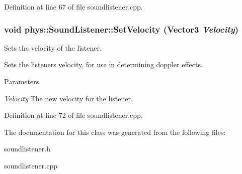 Definition at line 67 of file soundlistener.cpp.

\hypertarget{classphys_1_1SoundListener_a22e63d58ca9710f9a54fb08dbd9be4d9}{
\subsubsection[{SetVelocity}]{\setlength{\rightskip}{0pt plus 5cm}void phys::SoundListener::SetVelocity ({\bf Vector3} {\em Velocity})}}
\label{d1/d5a/classphys_1_1SoundListener_a22e63d58ca9710f9a54fb08dbd9be4d9}


Sets the velocity of the listener. 

Sets the listeners velocity, for use in determining doppler effects. 
\begin{DoxyParams}{Parameters}
\item[{\em Velocity}]The new velocity for the listener. \end{DoxyParams}


Definition at line 72 of file soundlistener.cpp.



The documentation for this class was generated from the following files:\begin{DoxyCompactItemize}
\item 
soundlistener.h\item 
soundlistener.cpp\end{DoxyCompactItemize}
